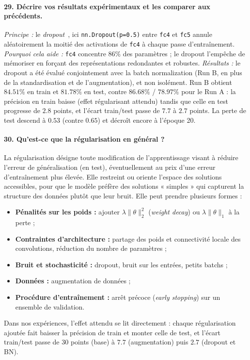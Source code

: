 \documentclass{report}
\begin{document}
\paragraph{29. Décrire vos résultats expérimentaux et les comparer aux précédents.}
 \textit{Principe :} le \textit{dropout}~\cite{srivastava2014}, ici \texttt{nn.Dropout(p=0.5)} entre \texttt{fc4} et \texttt{fc5} annule aléatoirement la moitié des activations de \texttt{fc4} à chaque passe d'entraînement. \textit{Pourquoi cela aide :} \texttt{fc4} concentre $86\%$ des paramètres ; le dropout l'empêche de mémoriser en forçant des représentations redondantes et robustes. \textit{Résultats :} le dropout a été évalué conjointement avec la batch normalization (Run B, en plus de la standardisation et de l'augmentation), et non isolément. Run B obtient $84.51\%$ en train et $81.78\%$ en test, contre $86.68\%$ / $78.97\%$ pour le Run A : la précision en train baisse (effet régularisant attendu) tandis que celle en test progresse de $2.8$ points, et l'écart train/test passe de $7.7$ à $2.7$ points. La perte de test descend à $0.53$ (contre $0.65$) et décroît encore à l'époque 20.

\paragraph{30. Qu'est-ce que la régularisation en général ?}
 La régularisation désigne toute modification de l'apprentissage visant à réduire l'erreur de généralisation (en test), éventuellement au prix d'une erreur d'entraînement plus élevée. Elle restreint ou oriente l'espace des solutions accessibles, pour que le modèle préfère des solutions « simples » qui capturent la structure des données plutôt que leur bruit. Elle peut prendre plusieurs formes :
\begin{itemize}
    \item \textbf{Pénalités sur les poids :} ajouter $\lambda \|\theta\|_2^2$ (\textit{weight decay}) ou $\lambda \|\theta\|_1$ à la perte ;
    \item \textbf{Contraintes d'architecture :} partage des poids et connectivité locale des convolutions, réduction du nombre de paramètres ;
    \item \textbf{Bruit et stochasticité :} dropout, bruit sur les entrées, petits batchs ;
    \item \textbf{Données :} augmentation de données ;
    \item \textbf{Procédure d'entraînement :} arrêt précoce (\textit{early stopping}) sur un ensemble de validation.
\end{itemize}
Dans nos expériences, l'effet attendu se lit directement : chaque régularisation ajoutée fait baisser la précision de train et monter celle de test, et l'écart train/test passe de $30$ points (base) à $7.7$ (augmentation) puis $2.7$ (dropout et BN).
\end{document}
